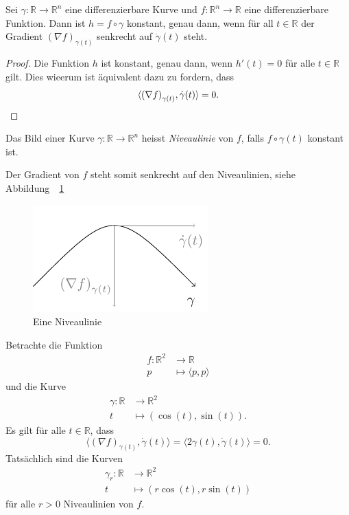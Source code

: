 \documentclass[../main.tex]{subfiles}
\begin{document}
\begin{proposition*}
  Sei $\gamma \colon \mathbb{R} \to \mathbb{R}^n$ 
  eine differenzierbare Kurve und 
  $f \colon \mathbb{R}^n \to \mathbb{R}$ eine
  differenzierbare Funktion.
  Dann ist $h = f \circ \gamma$ konstant, genau dann,
  wenn für all $t \in \mathbb{R}$ 
  der Gradient ${(\nabla f)}_{\gamma(t)}$ senkrecht auf
  $\dot \gamma(t)$ steht.
\end{proposition*}

\begin{proof}
  Die Funktion $h$ ist konstant, genau dann,
  wenn $h'(t) = 0$ für alle $t \in \mathbb{R}$ gilt.
  Dies wieerum ist äquivalent dazu zu fordern, dass
  \[
    \langle {(\nabla f)}_{\gamma(t)}, \dot \gamma(t) \rangle = 0.
    \qedhere
  \]
\end{proof}

\begin{definition}
  Das Bild einer Kurve $\gamma \colon \mathbb{R} \to \mathbb{R}^n$ 
  heisst \emph{Niveaulinie} von $f$,
  falls $f \circ \gamma(t)$ konstant ist.
\end{definition}

Der Gradient von $f$ steht somit senkrecht auf den Niveaulinien, siehe Abbildung~~\ref{fig:niveau}

\begin{figure}[htb]
  \centering
  \includegraphics{figures/niveau}
  \caption{Eine Niveaulinie}%
  \label{fig:niveau}
\end{figure}

\begin{example}
  Betrachte die Funktion
  \begin{align*}
    f \colon \mathbb{R}^2 & \to \mathbb{R} \\
    p & \mapsto \langle p, p \rangle
  \end{align*}
  und die Kurve
  \begin{align*}
    \gamma \colon \mathbb{R} & \to \mathbb{R}^2 \\
    t & \mapsto (\cos(t), \sin(t)).
  \end{align*}
  Es gilt für alle $t \in \mathbb{R}$,
  dass
  \[
  \langle {(\nabla f)}_{\gamma(t)}, \dot \gamma(t) \rangle
  = \langle 2 \gamma(t), \dot \gamma(t) \rangle = 0.
  \]
  Tatsächlich sind die Kurven
  \begin{align*}
    \gamma_r \colon \mathbb{R} & \to \mathbb{R}^2 \\
    t & \mapsto (r\cos(t), r\sin(t))
  \end{align*}
  für alle $r > 0$ Niveaulinien von $f$.
\end{example}
\end{document}
